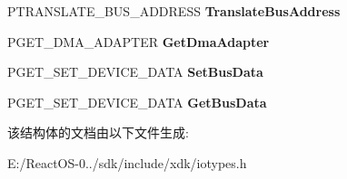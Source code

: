 \begin{DoxyCompactItemize}
P\+T\+R\+A\+N\+S\+L\+A\+T\+E\+\_\+\+B\+U\+S\+\_\+\+A\+D\+D\+R\+E\+SS {\bfseries Translate\+Bus\+Address}
\item 
\mbox{\label{struct___b_u_s___i_n_t_e_r_f_a_c_e___s_t_a_n_d_a_r_d_a9e50cdeca1bbb30cc7e94b3e8f199081}} 
P\+G\+E\+T\+\_\+\+D\+M\+A\+\_\+\+A\+D\+A\+P\+T\+ER {\bfseries Get\+Dma\+Adapter}
\item 
\mbox{\label{struct___b_u_s___i_n_t_e_r_f_a_c_e___s_t_a_n_d_a_r_d_a0239e1909a4370a2669e4d6479b79389}} 
P\+G\+E\+T\+\_\+\+S\+E\+T\+\_\+\+D\+E\+V\+I\+C\+E\+\_\+\+D\+A\+TA {\bfseries Set\+Bus\+Data}
\item 
\mbox{\label{struct___b_u_s___i_n_t_e_r_f_a_c_e___s_t_a_n_d_a_r_d_a348c86e75ef9b24290c0f3c7df8d75d8}} 
P\+G\+E\+T\+\_\+\+S\+E\+T\+\_\+\+D\+E\+V\+I\+C\+E\+\_\+\+D\+A\+TA {\bfseries Get\+Bus\+Data}
\end{DoxyCompactItemize}


该结构体的文档由以下文件生成\+:\begin{DoxyCompactItemize}
\item 
E\+:/\+React\+O\+S-\/0../sdk/include/xdk/iotypes.\+h\end{DoxyCompactItemize}

